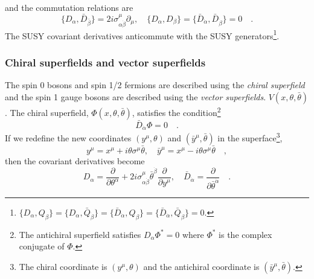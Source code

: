 %
and the commutation relations are
%
\begin{equation}
    \{D_{\alpha}, \bar{D}_{\bar{\beta}}\} = 2i \sigma^{\mu}_{\alpha \dot{\beta}} \partial_{\mu}, \quad
    \{D_{\alpha}, D_{\beta}\} = \{\bar{D}_{\dot{\alpha}}, \bar{D}_{\dot{\beta}}\} = 0 \quad .
    \label{eq:susy_susy_covariant_derivatives_commutation_relations}
\end{equation}
%
The SUSY covariant derivatives anticommute with the SUSY generators\footnote{$\{D_{\alpha}, Q_{\beta}\} = \{D_{\alpha}, \bar{Q}_{\dot{\beta}}\}= \{\bar{D}_{\dot{\alpha}}, Q_{\beta}\} = \{\bar{D}_{\dot{\alpha}}, \bar{Q}_{\dot{\beta}}\} =0$.}.


\subsubsection{Chiral superfields and vector superfields}
\label{subsec:susy_chiral_superfields_and_vector_superfields}
The spin 0 bosons and spin 1/2 fermions are described using the \textit{chiral superfield} and the spin 1 gauge bosons are described using the \textit{vector superfields}. $V(x, \theta, \bar{\theta})$.
The chiral superfield, $\Phi(x, \theta, \bar{\theta})$, satisfies the condition\footnote{The antichiral superfield satisfies $D_{\alpha}\Phi^{*} = 0$ where $\Phi^{*}$ is the complex conjugate of $\Phi$.}
%
\begin{equation}
    \bar{D}_{\dot{\alpha}} \Phi = 0 \quad .
    \label{eq:susy_chiral_superfield_condition}
\end{equation}
%
If we redefine the new coordinates $(y^{\mu}, \theta)$ and $(\bar{y}^{\mu}, \bar{\theta})$ in the superface\footnote{The chiral coordinate is $(y^{\mu}, \theta)$ and the antichiral coordinate is $(\bar{y}^{\mu}, \bar{\theta})$.},
%
\begin{equation}
    y^{\mu} = x^{\mu} + i \theta \sigma^{\mu} \bar{\theta}, \quad \bar{y}^{\mu} = x^{\mu} - i \theta \sigma^{\mu} \bar{\theta} \quad ,
    \label{eq:susy_chiral_coordinate}
\end{equation}
%
then the covariant derivatives become
%
\begin{equation}
    D_{\alpha} = \frac{\partial}{\partial \theta^{\alpha}} + 2i \sigma^{\mu}_{\alpha \dot{\beta}} \bar{\theta}^{\dot{\beta}} \frac{\partial}{\partial y^{\mu}}, \quad \bar{D}_{\dot{\alpha}} = \frac{\partial}{\partial \bar{\theta}^{\dot{\alpha}}} \quad .
    \label{eq:susy_chiral_covariant_derivative}
\end{equation}
